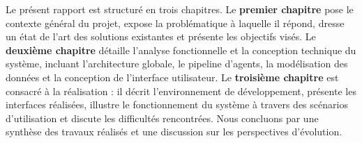 Le présent rapport est structuré en trois chapitres. Le \textbf{premier chapitre} pose le contexte général du projet, expose la problématique à laquelle il répond, dresse un état de l'art des solutions existantes et présente les objectifs visés. Le \textbf{deuxième chapitre} détaille l'analyse fonctionnelle et la conception technique du système, incluant l'architecture globale, le pipeline d'agents, la modélisation des données et la conception de l'interface utilisateur. Le \textbf{troisième chapitre} est consacré à la réalisation : il décrit l'environnement de développement, présente les interfaces réalisées, illustre le fonctionnement du système à travers des scénarios d'utilisation et discute les difficultés rencontrées. Nous concluons par une synthèse des travaux réalisés et une discussion sur les perspectives d'évolution.
